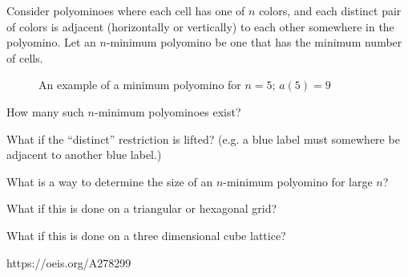 \documentclass{article}
\begin{document}
Consider polyominoes where each cell has one of $n$ colors, and
each distinct pair of colors is adjacent (horizontally or vertically) to each other
somewhere in the polyomino. Let an $n$-minimum polyomino be one that has the
minimum number of cells.

\begin{figure}[!h]
  \centering
  \caption{An example of a minimum polyomino for $n = 5$; $a(5)=9$}
\end{figure}

\begin{question}
  How many such $n$-minimum polyominoes exist?
\end{question}
\begin{related}
  \item What if the ``distinct'' restriction is lifted?
    (e.g. a blue label must somewhere be adjacent to another blue label.)
  \item What is a way to determine the size of an $n$-minimum polyomino for
    large $n$?
  \item What if this is done on a triangular or hexagonal grid?
  \item What if this is done on a three dimensional cube lattice?
\end{related}

\begin{references}
  \item https://oeis.org/A278299
\end{references}
\end{document}
